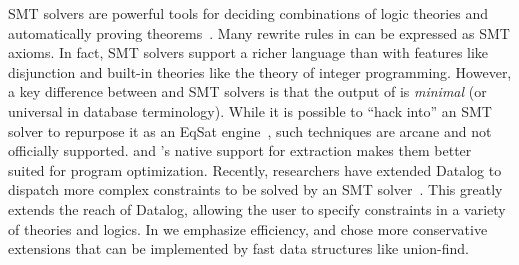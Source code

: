 SMT solvers are powerful tools for deciding combinations of logic theories and
 automatically proving theorems~\citep{z3,cvc4}.
Many rewrite rules in \egglog can be expressed as SMT axioms.
In fact,
 SMT solvers support a richer language than \egglog with features like disjunction 
 and built-in theories like the theory of integer programming.
However, a key difference between \egglog and SMT solvers is that
 the output of \egglog is \emph{minimal} (or universal in database terminology).
While it is possible to ``hack into'' an SMT solver to repurpose it 
 as an EqSat engine~\cite{flatt2022small}, 
 such techniques are arcane and not officially supported.
\eqsat and \egglog's native support for extraction
 makes them better suited for program optimization.
Recently, researchers have extended Datalog to dispatch more complex constraints 
 to be solved by an SMT solver~\cite{DBLP:journals/pacmpl/Bembenek0C20}.
This greatly extends the reach of Datalog, 
 allowing the user to specify constraints in a variety of theories and logics.
In \egglog we emphasize efficiency, 
 and chose more conservative extensions that can be implemented 
 by fast data structures like union-find.
